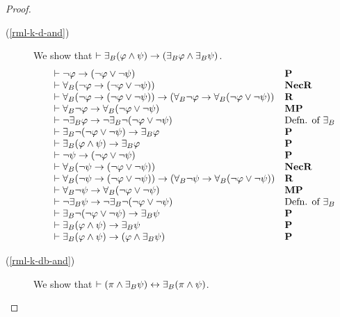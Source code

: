 \begin{proof}
\begin{description}
    \item[(\ref{rml-k-d-and})]
    We show that $\vdash {\exists_{B}} (\varphi \land \psi) \rightarrow ({\exists_{B}} \varphi \land {\exists_{B}} \psi)$.
    $$
    \begin{array}{ll}
        \vdash \lnot \varphi \rightarrow (\lnot \varphi \lor \lnot \psi) & {\bf P}\\
        \vdash {\forall_{B}} (\lnot \varphi \rightarrow (\lnot \varphi \lor \lnot \psi)) & {\bf NecR}\\
        \vdash {\forall_{B}} (\lnot \varphi \rightarrow (\lnot \varphi \lor \lnot \psi)) \rightarrow ({\forall_{B}} \lnot \varphi \rightarrow {\forall_{B}} (\lnot \varphi \lor \lnot \psi)) & {\bf R}\\
        \vdash {\forall_{B}} \lnot \varphi \rightarrow {\forall_{B}} (\lnot \varphi \lor \lnot \psi) & {\bf MP}\\
        \vdash \lnot {\exists_{B}} \varphi \rightarrow \lnot {\exists_{B}} \lnot (\lnot \varphi \lor \lnot \psi) & \text{Defn. of ${\exists_{B}}$}\\
        \vdash {\exists_{B}} \lnot (\lnot \varphi \lor \lnot \psi) \rightarrow {\exists_{B}} \varphi  & {\bf P}\\
        \vdash {\exists_{B}} (\varphi \land \psi) \rightarrow {\exists_{B}} \varphi  & {\bf P}\\
        \vdash \lnot \psi \rightarrow (\lnot \varphi \lor \lnot \psi) & {\bf P}\\
        \vdash {\forall_{B}} (\lnot \psi \rightarrow (\lnot \varphi \lor \lnot \psi)) & {\bf NecR}\\
        \vdash {\forall_{B}} (\lnot \psi \rightarrow (\lnot \varphi \lor \lnot \psi)) \rightarrow ({\forall_{B}} \lnot \psi \rightarrow {\forall_{B}} (\lnot \varphi \lor \lnot \psi)) & {\bf R}\\
        \vdash {\forall_{B}} \lnot \psi \rightarrow {\forall_{B}} (\lnot \varphi \lor \lnot \psi) & {\bf MP}\\
        \vdash \lnot {\exists_{B}} \psi \rightarrow \lnot {\exists_{B}} \lnot (\lnot \varphi \lor \lnot \psi) & \text{Defn. of ${\exists_{B}}$}\\
        \vdash {\exists_{B}} \lnot (\lnot \varphi \lor \lnot \psi) \rightarrow {\exists_{B}} \psi  & {\bf P}\\
        \vdash {\exists_{B}} (\varphi \land \psi) \rightarrow {\exists_{B}} \psi  & {\bf P}\\
        \vdash {\exists_{B}} (\varphi \land \psi) \rightarrow (\varphi \land {\exists_{B}} \psi) & {\bf P}
    \end{array}
    $$

    \item[(\ref{rml-k-db-and})]
    We show that $\vdash (\pi \land {\exists_{B}} \psi) \leftrightarrow {\exists_{B}} (\pi \land \psi)$.


\end{description}
\end{proof}
